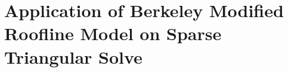 \section[Application of Berkeley Modified Roofline Model]{Application of Berkeley Modified Roofline Model on Sparse Triangular Solve}
\label{sec:mrm}


